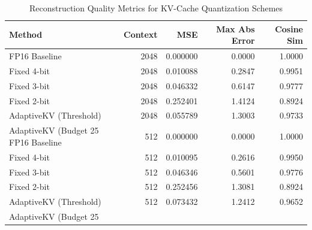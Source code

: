 \begin{table}[h]
\centering
\caption{Reconstruction Quality Metrics for KV-Cache Quantization Schemes}
\begin{tabular}{lrrrr}
\toprule
Method & Context & MSE & Max Abs Error & Cosine Sim \\
\midrule
FP16 Baseline & 2048 & 0.000000 & 0.0000 & 1.0000 \\
Fixed 4-bit & 2048 & 0.010088 & 0.2847 & 0.9951 \\
Fixed 3-bit & 2048 & 0.046332 & 0.6147 & 0.9777 \\
Fixed 2-bit & 2048 & 0.252401 & 1.4124 & 0.8924 \\
AdaptiveKV (Threshold) & 2048 & 0.055789 & 1.3003 & 0.9733 \\
AdaptiveKV (Budget 25%
FP16 Baseline & 512 & 0.000000 & 0.0000 & 1.0000 \\
Fixed 4-bit & 512 & 0.010095 & 0.2616 & 0.9950 \\
Fixed 3-bit & 512 & 0.046346 & 0.5601 & 0.9776 \\
Fixed 2-bit & 512 & 0.252456 & 1.3081 & 0.8924 \\
AdaptiveKV (Threshold) & 512 & 0.073432 & 1.2412 & 0.9652 \\
AdaptiveKV (Budget 25%
\bottomrule
\end{tabular}
\end{table}
